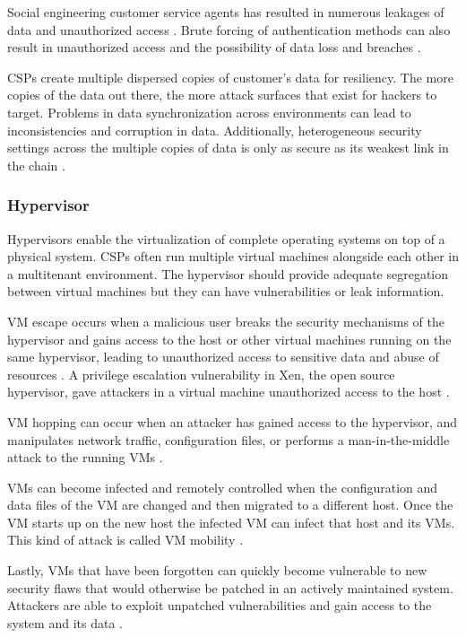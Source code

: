 \documentclass[12pt]{article}
\begin{document}
Social engineering customer service agents has resulted in numerous leakages of data and unauthorized access \cite{amazonse,icloudse}. Brute forcing of authentication methods can also result in unauthorized access and the possibility of data loss and breaches \cite{alertlogicsecurity}.

CSPs create multiple dispersed copies of customer's data for resiliency. The more copies of the data out there, the more attack surfaces that exist for hackers to target. Problems in data synchronization across environments can lead to inconsistencies and corruption in data. Additionally, heterogeneous security settings across the multiple copies of data is only as secure as its weakest link in the chain \cite{liu2015survey}.


\subsubsection{Hypervisor}

Hypervisors enable the virtualization of complete operating systems on top of a physical system. CSPs often run multiple virtual machines alongside each other in a multitenant environment. The hypervisor should provide adequate segregation between virtual machines but they can have vulnerabilities or leak information.

VM escape occurs when a malicious user breaks the security mechanisms of the hypervisor and gains access to the host or other virtual machines running on the same hypervisor, leading to unauthorized access to sensitive data and abuse of resources \cite{owens2009securing}. A privilege escalation vulnerability in Xen, the open source hypervisor, gave attackers in a virtual machine unauthorized access to the host \cite{xenprivilege}.

VM hopping can occur when an attacker has gained access to the hypervisor, and manipulates network traffic, configuration files, or performs a man-in-the-middle attack to the running VMs \cite{hyde2009survey}.

VMs can become infected and remotely controlled when the configuration and data files of the VM are changed and then migrated to a different host. Once the VM starts up on the new host the infected VM can infect that host and its VMs. This kind of attack is called VM mobility \cite{hyde2009survey,zhang2011virtualization}.

Lastly, VMs that have  been forgotten can quickly become vulnerable to new security flaws that would otherwise be patched in an actively maintained system. Attackers are able to exploit unpatched vulnerabilities and gain access to the system and its data \cite{jasti2010security}.
\end{document}
